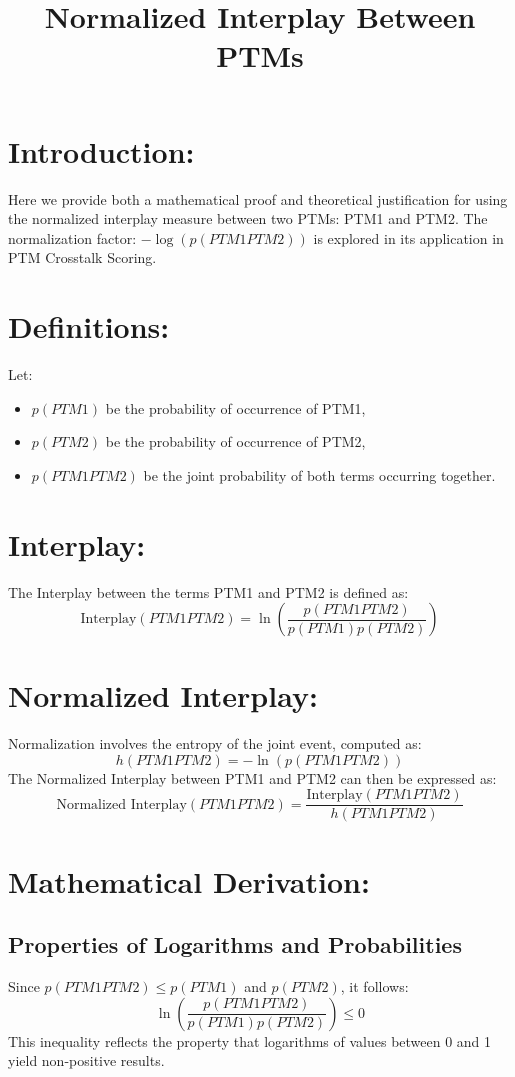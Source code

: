 \documentclass{article}
\begin{document}
\title{Normalized Interplay Between PTMs}
\author{}
\date{}
\maketitle

\section*{Introduction:}
Here we provide both a mathematical proof and theoretical justification for using the normalized interplay measure between two PTMs: PTM1 and PTM2. The normalization factor: \(-\log(p(PTM1  PTM2))\) is explored in its application in PTM Crosstalk Scoring.

\section*{Definitions:}
Let:
\begin{itemize}
  \item \( p(PTM1) \) be the probability of occurrence of PTM1,
  \item \( p(PTM2) \) be the probability of occurrence of PTM2,
  \item \( p(PTM1 PTM2) \) be the joint probability of both terms occurring together.
\end{itemize}

\section*{Interplay:}
The Interplay between the terms PTM1 and PTM2 is defined as:
\[
\text{Interplay}(PTM1  PTM2) = \ln \left(\frac{p(PTM1  PTM2)}{p(PTM1) p(PTM2)}\right)
\]

\section*{Normalized Interplay:}
Normalization involves the entropy of the joint event, computed as:
\[
h(PTM1  PTM2) = -\ln(p(PTM1  PTM2))
\]
The Normalized Interplay between PTM1 and PTM2 can then be expressed as:
\[
\text{Normalized Interplay}(PTM1  PTM2) = \frac{\text{Interplay}(PTM1  PTM2)}{h(PTM1  PTM2)}
\]

\section*{Mathematical Derivation:}
\subsection*{Properties of Logarithms and Probabilities}
Since \( p(PTM1  PTM2) \leq p(PTM1) \) and \( p(PTM2) \), it follows:
\[
\ln \left(\frac{p(PTM1  PTM2)}{p(PTM1) p(PTM2)}\right) \leq 0
\]
This inequality reflects the property that logarithms of values between 0 and 1 yield non-positive results.
\end{document}
